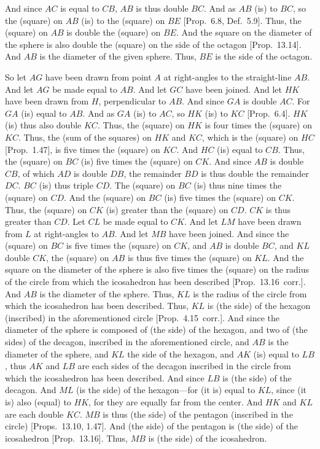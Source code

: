 And since $AC$ is equal to $CB$, $AB$ is thus double $BC$.  And
as $AB$ (is) to $BC$, so the (square) on $AB$ (is) to the (square)
on $BE$ [Prop.~6.8, Def.~5.9]. Thus, the (square) on $AB$
is double the (square) on $BE$. And the square on the diameter
of the sphere is also double the (square) on the side of the octagon [Prop.~13.14]. And $AB$ is the diameter of the given sphere. Thus,
$BE$ is the side of the octagon.

So let $AG$ have been drawn from point $A$ at right-angles to the straight-line
$AB$. And let $AG$ be made equal to $AB$. And let $GC$
have been joined. And let $HK$ have been drawn from $H$, perpendicular to $AB$. And since $GA$ is double $AC$. 
For $GA$ (is) equal to $AB$.  And as $GA$ (is) to $AC$, so
$HK$ (is) to $KC$ [Prop.~6.4]. $HK$ (is) thus also double
$KC$. Thus, the (square) on $HK$ is four times the (square)
on $KC$. Thus, the (sum of the squares) on $HK$ and $KC$,
which is the (square) on $HC$ [Prop.~1.47],  is five times the
(square) on $KC$.  And $HC$ (is) equal to $CB$. Thus,
the (square) on $BC$ (is) five times the (square) on  $CK$. 
And since $AB$ is double $CB$, of which $AD$ is double $DB$, 
the remainder $BD$ is thus double the remainder $DC$.
$BC$ (is) thus triple $CD$. The (square) on $BC$ (is) thus nine times 
the (square) on $CD$.  And the (square) on $BC$ (is) five times the (square)
on $CK$.  Thus, the (square) on $CK$ (is) greater than the (square) on $CD$.
$CK$ is thus greater than $CD$. Let $CL$ be made equal to $CK$.
And let $LM$ have been drawn from $L$ at right-angles to $AB$. 
And let $MB$ have been joined. And since the (square) on  $BC$
is five times the (square) on $CK$, and $AB$ is double $BC$, and $KL$
double $CK$, the (square) on $AB$ is thus five times the (square)
on $KL$. And the square on the diameter of the sphere  is also five times
the (square) on the radius of the circle from which the icosahedron has been
described [Prop.~13.16~corr.]. And $AB$ is the diameter of the sphere.
Thus, $KL$ is the radius of the circle from which the icosahedron has
been described. Thus, $KL$ is (the side) of the hexagon (inscribed) in the aforementioned
circle [Prop.~4.15~corr.]. And since the diameter of the sphere is composed of (the side) of the hexagon, and two of (the sides) of the decagon, inscribed
in the aforementioned circle, and $AB$ is the diameter of the sphere, 
and $KL$ the side of the hexagon, and $AK$ (is) equal to $LB$, thus
$AK$ and $LB$ are each sides of the decagon inscribed in the  circle
from which the icosahedron has been described. And since
$LB$ is (the side) of the decagon. And $ML$ (is the side) of the hexagon---for (it is) equal to $KL$, since (it is) also (equal) to $HK$, for they are equally
far from the center. And $HK$ and $KL$ are each double $KC$. 
$MB$ is thus (the side) of the pentagon (inscribed in the circle) [Props.~13.10, 1.47]. 
And (the side) of the pentagon is (the side) of the icosahedron [Prop.~13.16]. 
Thus, $MB$ is (the side) of the icosahedron. 

